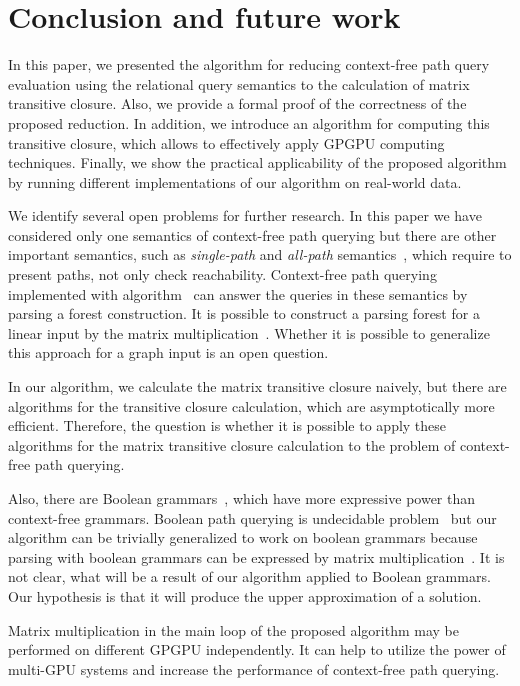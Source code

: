 \section{Conclusion and future work}
In this paper, we presented the algorithm for reducing context-free path query evaluation using the relational query semantics to the calculation of matrix transitive closure. Also, we provide a formal proof of the correctness of the proposed reduction. In addition, we introduce an algorithm for computing this transitive closure, which allows to effectively apply GPGPU computing techniques. Finally, we show the practical applicability of the proposed algorithm by running different implementations of our algorithm on real-world data.

We identify several open problems for further research. In this paper we have considered only one semantics of context-free path querying but there are other important semantics, such as \textit{single-path} and \textit{all-path} semantics~\cite{hellingsPathQuerying}, which require to present paths, not only check reachability. Context-free path querying implemented with algorithm~\cite{GLL} can answer the queries in these semantics by parsing a forest construction. It is possible to construct a parsing forest for a linear input by the matrix multiplication~\cite{okhotin_cyk}. Whether it is possible to generalize this approach for a graph input is an open question.

In our algorithm, we calculate the matrix transitive closure naively, but there are algorithms for the transitive closure calculation, which are asymptotically more efficient. Therefore, the question is whether it is possible to apply these algorithms for the matrix transitive closure calculation to the problem of context-free path querying.

Also, there are Boolean grammars~\cite{okhotinBoolean}, which have more expressive power than context-free grammars. Boolean path querying is undecidable problem~\cite{hellingsRelational} but our algorithm can be trivially generalized to work on boolean grammars because parsing with boolean grammars can be expressed by matrix multiplication~\cite{okhotin_cyk}. It is not clear, what will be a result of our algorithm applied to Boolean grammars. Our hypothesis is that it will produce the upper approximation of a solution.

Matrix multiplication in the main loop of the proposed algorithm may be performed on different GPGPU independently. It can help to utilize the power of multi-GPU systems and increase the performance of context-free path querying.